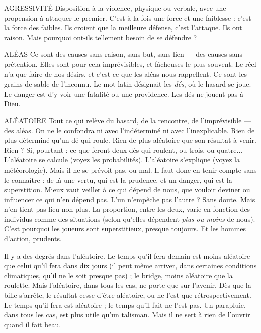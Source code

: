 AGRESSIVITÉ Disposition à la violence, physique ou verbale, avec une propension
à attaquer le premier. C’est à la fois une force et une
faiblesse : c’est la force des faibles. Ils croient que la meilleure défense, c’est
l'attaque. Ils ont raison. Mais pourquoi ont-ils tellement besoin de se défendre ?

ALÉAS Ce sont des causes sans raison, sans but, sans lien — des causes sans
prétention. Elles sont pour cela imprévisibles, et fâcheuses le plus
souvent. Le réel n’a que faire de nos désirs, et c’est ce que les aléas nous rappellent.
Ce sont les grains de sable de l'inconnu. Le mot latin désignait les {\it dés}, où
le hasard se joue. Le danger est d’y voir une fatalité ou une providence. Les dés
ne jouent pas à Dieu.

ALÉATOIRE Tout ce qui relève du hasard, de la rencontre, de l’imprévisible
— des aléas. On ne le confondra ni avec l’indéterminé ni avec
l’inexplicable. Rien de plus déterminé qu’un dé qui roule. Rien de plus aléatoire
que son résultat à venir. Rien ? Si, pourtant : ce que feront deux dés qui
roulent, ou trois, ou quatre... L’aléatoire se calcule (voyez les probabilités).
L’aléatoire s'explique (voyez la météorologie). Mais il ne se prévoit pas, ou mal.
Il faut donc en tenir compte sans le connaître : de là une vertu, qui est la prudence,
et un danger, qui est la superstition. Mieux vaut veiller à ce qui dépend
de nous, que vouloir deviner ou influencer ce qui n’en dépend pas. L’un
n'empêche pas l’autre ? Sans doute. Mais n’en tient pas lieu non plus. La proportion,
entre les deux, varie en fonction des individus comme des situations
(selon qu’elles dépendent {\it plus ou moins} de nous). C’est pourquoi les joueurs
sont superstitieux, presque toujours. Et les hommes d’action, prudents.

Il y a des degrés dans l’aléatoire. Le temps qu’il fera demain est moins aléatoire
que celui qu’il fera dans dix jours (il peut même arriver, dans certaines
conditions climatiques, qu’il ne le soit presque pas) ; le bridge, moins aléatoire
que la roulette. Mais l’aléatoire, dans tous les cas, ne porte que sur l’avenir. Dès
que la bille s'arrête, le résultat cesse d’être aléatoire, ou ne l’est que rétrospectivement.
Le temps qu’il fera est aléatoire ; le temps qu’il fait ne l’est pas. Un
parapluie, dans tous les cas, est plus utile qu’un talisman. Mais il ne sert à rien
de l’ouvrir quand il fait beau.

